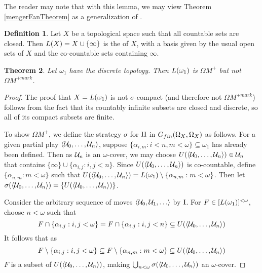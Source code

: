 \documentclass{amsart}
\theoremstyle{plain}
\newtheorem{theorem}{Theorem}
\theoremstyle{definition}
\newtheorem{definition}[theorem]{Definition}
\theoremstyle{remark}
\theoremstyle{plain}
\theoremstyle{definition}
\theoremstyle{remark}
\begin{document}
The reader may note that with this lemma, we may view Theorem
\ref{mengerFanTheorem} as a generalization of
\cite[Proposition 2.6]{MR2868880}.

\begin{definition}
  Let \(X\) be a topological space such that all countable sets are
  closed. Then \(L(X)=X\cup\{\infty\}\)
  is the  of \(X\), with a basis given
  by the usual open sets of \(X\) and the co-countable sets containing
  \(\infty\).
\end{definition}

\begin{theorem}\label{omega1OmegaMenger}
  Let \(\omega_1\) have the discrete topology. Then
  \(L(\omega_1)\) is \(\Omega M^+\) but not \(\Omega M^{+mark}\).
\end{theorem}

\begin{proof}
  The proof that \(X=L(\omega_1)\) is not
  \(\sigma\)-compact (and therefore not \(\Omega M^{+mark}\))
  follows from the fact that its countably infinite subsets
  are closed and discrete, so all of its compact subsets are finite.

  To show \(\Omega M^+\),
  we define the strategy \(\sigma\) for \(\mathrm{II}\) in
  \(G_{fin}(\Omega_X,\Omega_X)\) as follows.
  For a given partial play \(\langle\mathcal{U}_0,\dots,\mathcal{U}_n\rangle\), suppose
  \(\{\alpha_{i,m}:i<n,m<\omega\}\subseteq\omega_1\) has already been defined.
  Then as \(\mathcal{U}_n\) is an \(\omega\)-cover, we may
  choose \(U(\langle\mathcal{U}_0,\dots,\mathcal{U}_n\rangle)\in\mathcal{U}_n\) that contains
  \(\{\infty\}\cup\{\alpha_{i,j}:i,j<n\}\). Since
  \(U(\langle\mathcal{U}_0,\dots,\mathcal{U}_n\rangle)\) is co-countable, define
  \(\{\alpha_{n,m}:m<\omega\}\) such that
  \(
    U(\langle\mathcal{U}_0,\dots,\mathcal{U}_n\rangle)
      =
    L(\omega_1)
      \setminus
    \{\alpha_{n,m}:m<\omega\}
  \). Then let
  \(\sigma(\langle\mathcal{U}_0,\dots,\mathcal{U}_n\rangle)=\{U(\langle\mathcal{U}_0,\dots,\mathcal{U}_n\rangle)\}\).

  Consider the arbitrary sequence of moves \(\<\mc U_0,\mc U_1,\dots\>\)
  by \(\mathrm{I}\). For \(F\in[L(\omega_1)]^{<\omega}\), choose
  \(n<\omega\) such that
  \[
    F\cap\{\alpha_{i,j}:i,j<\omega\}
      =
    F\cap\{\alpha_{i,j}:i,j<n\}
      \subseteq
    U(\langle\mathcal{U}_0,\dots,\mathcal{U}_n\rangle)
  \]
  It follows that as
  \[
    F
      \setminus
    \{\alpha_{i,j}:i,j<\omega\}
      \subseteq
    F
      \setminus
    \{\alpha_{n,m}:m<\omega\}
      \subseteq
    U(\langle\mathcal{U}_0,\dots,\mathcal{U}_n\rangle)
  \]
  \(F\) is a subset of
  \(U(\langle\mathcal{U}_0,\dots,\mathcal{U}_n\rangle)\), making
  \(
    \bigcup_{n<\omega}
    \sigma(\langle\mathcal{U}_0,\dots,\mathcal{U}_n\rangle)
  \)
  an \(\omega\)-cover.
\end{proof}
\end{document}

